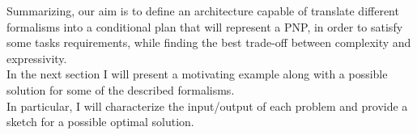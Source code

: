 \documentclass[pdftex,12pt,a4paper]{report}
\begin{document}
\noindent Summarizing, our aim is to define an architecture capable of translate different formalisms into a conditional plan that will represent a PNP, in order to satisfy some tasks requirements, while finding the best trade-off between complexity and expressivity. \\

\noindent In the next section I will present a motivating example along with a possible solution for some of the described formalisms. \\
In particular, I will characterize the input/output of each problem and provide a sketch for a possible optimal solution.
\end{document}
